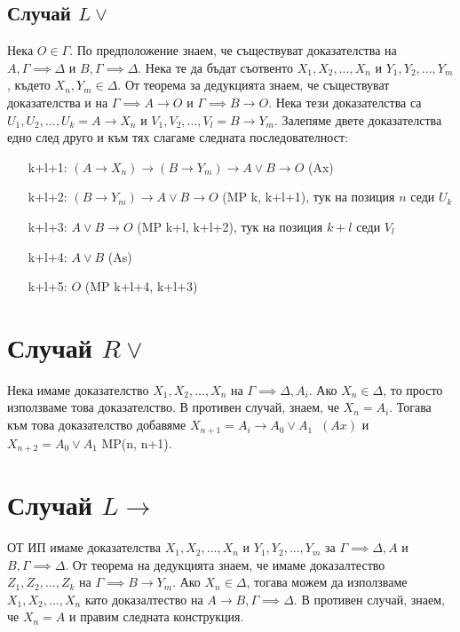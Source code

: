 \documentclass[12pt]{article}
\begin{document}
\subsection*{Случай $L \lor$}
Нека $O \in \Gamma$. По предположение знаем, че съществуват доказателства на $A, \Gamma \implies \Delta$ и $B, \Gamma \implies \Delta$. Нека те да бъдат съотвенто $X_1, X_2, ..., X_n$ и $Y_1, Y_2, ..., Y_m$, където $X_n, Y_m \in \Delta$. От теорема за дедукцията знаем, че съществуват доказателства и на $\Gamma \implies A \rightarrow O$ и $\Gamma \implies B \rightarrow O$. Нека тези доказателства са $U_1, U_2, ..., U_k = A \rightarrow X_n$ и $V_1, V_2, ..., V_l = B \rightarrow Y_m$. Залепяме двете доказателства едно след друго и към тях слагаме следната последователност:
\begin{itemize}[itemindent=4em]
    \item[k+l+1: ] $ (A \rightarrow X_n) \rightarrow (B \rightarrow Y_m) \rightarrow A \lor B \rightarrow O $ (Ax)    
    \item[k+l+2: ] $(B \rightarrow Y_m) \rightarrow A \lor B \rightarrow O$ (MP k, k+l+1), тук на позиция $n$ седи $U_k$ 
    \item[k+l+3: ] $A \lor B \rightarrow O$ (MP k+l, k+l+2), тук на позиция $k+l$ седи $V_l$ 
    \item[k+l+4: ] $ A \lor B $ (As) 
    \item[k+l+5: ] $O$ (MP k+l+4, k+l+3)
\end{itemize}

\section*{Случай $R \lor$}
Нека имаме доказателство $X_1, X_2, ..., X_n$ на $\Gamma \implies \Delta, A_i$. Ако $X_n \in \Delta$, то просто използваме това доказателство. В противен случай, знаем, че $X_n = A_i$. Тогава към това доказателство добавяме $X_{n+1} = A_i \rightarrow A_0 \lor A_1 \; \; (Ax)$ и $X_{n+2} = A_0 \lor A_1$ MP(n, n+1). 

\section*{Случай $L \rightarrow$}
ОТ ИП имаме доказателства $X_1, X_2, ..., X_n$ и $Y_1, Y_2, ..., Y_m$ за $\Gamma \implies \Delta, A$ и $B, \Gamma \implies \Delta$. От теорема на дедукцията знаем, че имаме доказалтество $Z_1, Z_2, ..., Z_k$ на $\Gamma \implies B \rightarrow Y_m$. Ако $X_n \in \Delta$, тогава можем да използваме $X_1, X_2, ..., X_n$ като доказалтество на $A \rightarrow B, \Gamma \implies \Delta$. В противен случай, знаем, че $X_n = A$ и правим следната конструкция.  
\end{document}
